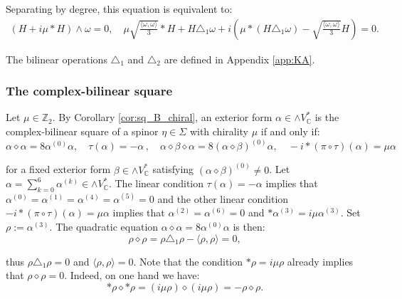 \documentclass[10pt,a4paper,twoside,reqno]{amsart}
\theoremstyle{plain}
\theoremstyle{definition}
\theoremstyle{remark}
\def\C{\mathbb{C}}
\newcommand{\escal}[1]{\langle#1\rangle}
\begin{document}
\noindent
Separating by degree, this equation is equivalent to: 
\begin{eqnarray*}
(H+i\mu \ast H )\wedge\omega=0,\quad \mu \sqrt{\frac{\escal{\omega,\omega}}{3}} \ast H + H\triangle_1\omega+i  ( \mu \ast( H\triangle_1\omega) - \sqrt{\frac{\escal{\omega,\omega}}{3}} H)=0.
\end{eqnarray*}

\noindent
The bilinear operations $\triangle_1$ and $\triangle_2$ are defined in Appendix \ref{app:KA}.


\subsubsection{The complex-bilinear square}


Let $\mu\in\mathbb{Z}_2$. By Corollary \ref{cor:sq_B_chiral}, an exterior form $\alpha\in\wedge V^*_\C$ is the complex-bilinear square of a spinor $\eta\in\Sigma$ with chirality $\mu$ if and only if:
\begin{equation*}
\alpha\diamond\alpha=8\alpha^{(0)}\alpha,\quad\tau(\alpha) =-\alpha\, , \quad \alpha \diamond \beta \diamond \alpha = 8 (\alpha\diamond\beta)^{(0)} \alpha,\quad-i*(\pi\circ\tau)(\alpha)=\mu\alpha  
\end{equation*}

\noindent
for a fixed exterior form $\beta\in\wedge V^*_\C$ satisfying $(\alpha\diamond\beta)^{(0)}\neq0$. Let $\alpha=\sum_{k=0}^6\alpha^{(k)}\in\wedge V^*_\C$. The linear condition $\tau(\alpha)=-\alpha$ implies that $\alpha^{(0)}=\alpha^{(1)}=\alpha^{(4)}=\alpha^{(5)}=0$ and the other linear condition $-i*(\pi\circ\tau)(\alpha)=\mu\alpha$ implies that $\alpha^{(2)}=\alpha^{(6)}=0$ and $*\alpha^{(3)}=i\mu\alpha^{(3)}$. Set $\rho:=\alpha^{(3)}$. The quadratic equation $\alpha\diamond\alpha=8\alpha^{(0)}\alpha$ is then:
\begin{equation*}
\rho\diamond\rho=\rho\triangle_1\rho-\escal{\rho,\rho}=0,
\end{equation*}

\noindent
thus $\rho\triangle_1\rho=0$ and $\escal{\rho,\rho}=0$. Note that the condition $*\rho=i\mu\rho$ already implies that $\rho\diamond\rho=0$. Indeed, on one hand we have: 
\begin{equation*}
*\rho\diamond*\rho=(i\mu\rho)\diamond(i\mu\rho)=-\rho\diamond\rho.
\end{equation*}
\end{document}
